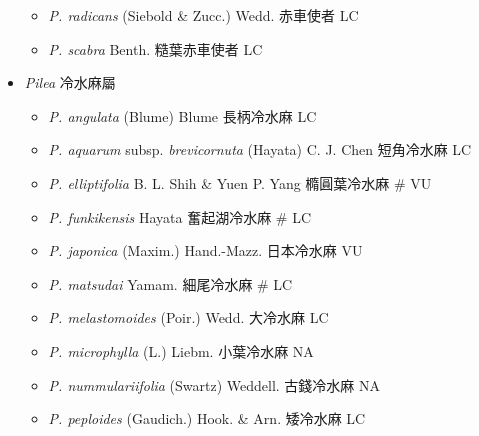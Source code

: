 \begin{itemize}
  \begin{itemize}
        \item[] \textit{P. radicans} (Siebold \& Zucc.) Wedd.  赤車使者   LC
        \item[] \textit{P. scabra} Benth.  糙葉赤車使者   LC
  \end{itemize}
 \item[] \textit{Pilea} 冷水麻屬
                                
  \begin{itemize}
        \item[] \textit{P. angulata} (Blume) Blume  長柄冷水麻   LC
        \item[] \textit{P. aquarum} subsp. \textit{brevicornuta} (Hayata) C. J. Chen  短角冷水麻   LC
        \item[] \textit{P. elliptifolia} B. L. Shih \& Yuen P. Yang  橢圓葉冷水麻  \# VU
        \item[] \textit{P. funkikensis} Hayata  奮起湖冷水麻  \# LC
        \item[] \textit{P. japonica} (Maxim.) Hand.-Mazz.  日本冷水麻   VU
        \item[] \textit{P. matsudai} Yamam.  細尾冷水麻  \# LC
        \item[] \textit{P. melastomoides} (Poir.) Wedd.  大冷水麻   LC
        \item[] \textit{P. microphylla} (L.) Liebm.  小葉冷水麻   NA
        \item[] \textit{P. nummulariifolia} (Swartz) Weddell.  古錢冷水麻   NA
        \item[] \textit{P. peploides} (Gaudich.) Hook. \& Arn.  矮冷水麻   LC

\end{itemize}
\end{itemize}
